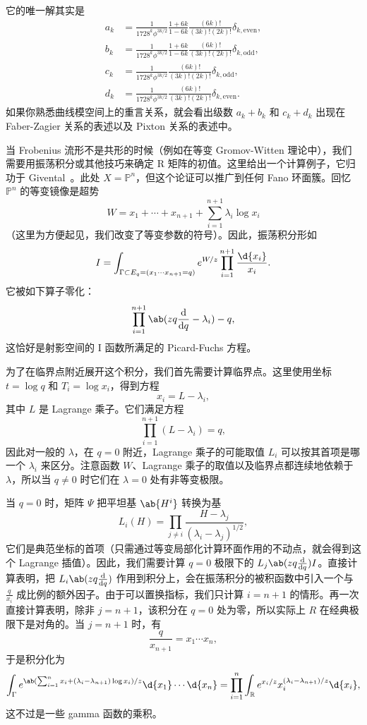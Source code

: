 \documentclass{amsart}
\theoremstyle{definition}
\theoremstyle{remark}
\theoremstyle{plain}
\theoremstyle{definition}
\theoremstyle{remark}
\newcommand{\R}{\mathbb{R}}
\renewcommand{\P}{\mathbb{P}}
\newcommand{\1}{\mathbf{1}}
\newcommand{\2}{\mathbf{2}}
\newcommand{\3}{\mathbf{3}}
\begin{document}
它的唯一解其实是
\begin{align*}
    a_k &= \frac{1}{1728^k \phi^{3k/2}} \frac{1+6k}{1-6k} \frac{(6k)!}{(3k)!(2k)!} \delta_{k, \text{even}},  \\
    b_k &= \frac{1}{1728^k \phi^{3k/2}} \frac{1+6k}{1-6k}\frac{(6k)!}{(3k)!(2k)!} \delta_{k, \text{odd}},  \\
    c_k &= \frac{1}{1728^k \phi^{3k/2}}\frac{(6k)!}{(3k)!(2k)!} \delta_{k, \text{odd}}, \\
    d_k &= \frac{1}{1728^k \phi^{3k/2}} \frac{(6k)!}{(3k)!(2k)!} \delta_{k, \text{even}}. 
\end{align*}
如果你熟悉曲线模空间上的重言关系，就会看出级数 \(a_k + b_k\) 和 \(c_k + d_k\) 出现在 Faber-Zagier 关系的表述以及 Pixton 关系的表述中。

当 Frobenius 流形不是共形的时候（例如在等变 Gromov-Witten 理论中），我们需要用振荡积分或其他技巧来确定 R 矩阵的初值。这里给出一个计算例子，它归功于 Givental~\cite{Givental2001semisimple}。此处 \(X = \P^n\)，但这个论证可以推广到任何 Fano 环面簇。回忆 \(\P^n\) 的等变镜像是超势
\[ W = x_1 + \cdots + x_{n+1} + \sum_{i=1}^{n+1} \lambda_i \log x_i \]
（这里为方便起见，我们改变了等变参数的符号）。因此，振荡积分形如
\[ I = \int_{\Gamma \subset E_q = (x_1 \cdots x_{n+1}=q)} e^{W/z} \prod_{i=1}^{n+1} \frac{\d{x_i}}{x_i}. \]
它被如下算子零化：
\[ \prod_{i=1}^{n+1}\ab(zq \odv{}{q} -\lambda_i) - q, \]
这恰好是射影空间的 I 函数所满足的 Picard-Fuchs 方程。

为了在临界点附近展开这个积分，我们首先需要计算临界点。这里使用坐标 \(t = \log q\) 和 \(T_i = \log x_i\)，得到方程
\[ x_i = L - \lambda_i, \]
其中 \(L\) 是 Lagrange 乘子。它们满足方程
\[ \prod_{i=1}^{n+1} (L - \lambda_i) = q, \]
因此对一般的 \(\lambda\)，在 \(q = 0\) 附近，Lagrange 乘子的可能取值 \(L_i\) 可以按其首项是哪一个 \(\lambda_i\) 来区分。注意函数 \(W\)、Lagrange 乘子的取值以及临界点都连续地依赖于 \(\lambda\)，所以当 \(q \neq 0\) 时它们在 \(\lambda = 0\) 处有非等变极限。

当 \(q = 0\) 时，矩阵 \(\Psi\) 把平坦基 \(\ab{H^i}\) 转换为基
\[ L_i(H) = \prod_{j \neq i} \frac{H - \lambda_j}{(\lambda_i - \lambda_j)^{1/2}}, \]
它们是典范坐标的首项（只需通过等变局部化计算环面作用的不动点，就会得到这个 Lagrange 插值）。因此，我们需要计算 \(q = 0\) 极限下的 \(L_j \ab(z q \odv{}{q}) I\)。直接计算表明，把 \(L_i \ab(z q \odv{}{q})\) 作用到积分上，会在振荡积分的被积函数中引入一个与 \(\frac{q}{x_i}\) 成比例的额外因子。由于可以置换指标，我们只计算 \(i = n+1\) 的情形。再一次直接计算表明，除非 \( j = n+1\)，该积分在 \(q = 0\) 处为零，所以实际上 \(R\) 在经典极限下是对角的。当 \(j = n+1\) 时，有
\[ \frac{q}{x_{n+1}} = x_1 \cdots x_n, \]
于是积分化为
\[ \int_{\Gamma} e^{\ab( \sum_{i=1}^n x_i + (\lambda_i - \lambda_{n+1})\log x_i ) / z} \d{x_1} \cdots \d{x_n} = \prod_{i=1}^n \int_{\R} e^{x_i/z} x_i^{(\lambda_i - \lambda_{n+1})/z} \d{x_i}, \]
这不过是一些 gamma 函数的乘积。
\end{document}
